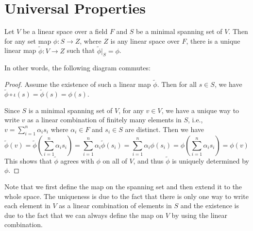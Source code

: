 \documentclass[
	11pt, %
	fleqn, %
	a4paper, %
]{LegrandOrangeBook}
\begin{document}
\section{Universal Properties}

\begin{proposition}
    Let $V$ be a linear space over a field $F$ and $S$ be a minimal spanning set of $V$. Then for any set map $\phi : S \to Z$, where $Z$ is any linear space over $F$, there is a unique linear map $\tilde{\phi} : V \to Z$ such that $\tilde{\phi}|_S = \phi$.

    In other words, the following diagram commutes:
    \begin{center}
    \end{center}
\end{proposition}

\begin{proof}
    Assume the existence of such a linear map $\tilde{\phi}$. Then for all $s \in S$, we have $\tilde{\phi} \circ \iota (s) = \tilde{\phi}(s) = \phi(s)$.

    Since $S$ is a minimal spanning set of $V$, for any $v \in V$, we have a unique way to write $v$ as a linear combination of finitely many elements in $S$, i.e., $v = \sum_{i=1}^{n} \alpha_i s_i$ where $\alpha_i \in F$ and $s_i \in S$ are distinct. Then we have 
    \[
        \tilde{\phi}(v) = \tilde{\phi}\left(\sum_{i=1}^{n} \alpha_i s_i\right) = \sum_{i=1}^{n} \alpha_i \tilde{\phi}(s_i) = \sum_{i=1}^{n} \alpha_i \phi(s_i) = \phi\left(\sum_{i=1}^{n} \alpha_i s_i\right) = \phi(v)
    \]
    This shows that $\tilde{\phi}$ agrees with $\phi$ on all of $V$, and thus $\tilde{\phi}$ is uniquely determined by $\phi$.
\end{proof}

Note that we first define the map on the spanning set and then extend it to the whole space. The uniqueness is due to the fact that there is only one way to write each element in $V$ as a linear combination of elements in $S$ and the existence is due to the fact that we can always define the map on $V$ by using the linear combination.
\end{document}
